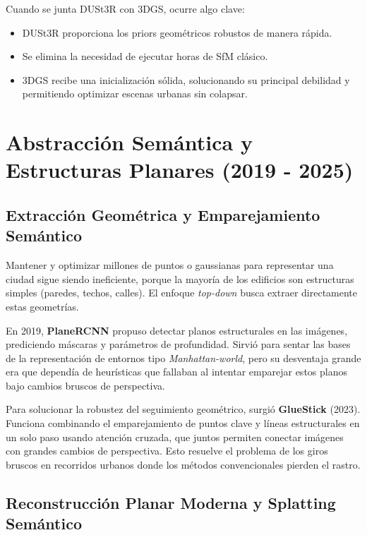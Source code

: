 Cuando se junta DUSt3R con 3DGS, ocurre algo clave:
\begin{itemize}
    \item DUSt3R proporciona los priors geométricos robustos de manera rápida.
    \item Se elimina la necesidad de ejecutar horas de SfM clásico.
    \item 3DGS recibe una inicialización sólida, solucionando su principal debilidad y permitiendo optimizar escenas urbanas sin colapsar.
\end{itemize}

\section{Abstracción Semántica y Estructuras Planares (2019 - 2025)}

\subsection{Extracción Geométrica y Emparejamiento Semántico}

Mantener y optimizar millones de puntos o gaussianas para representar una ciudad sigue siendo ineficiente, porque la mayoría de los edificios son estructuras simples (paredes, techos, calles). El enfoque \textit{top-down} busca extraer directamente estas geometrías.

En 2019, \textbf{PlaneRCNN} \cite{liu2019planercnn} propuso detectar planos estructurales en las imágenes, prediciendo máscaras y parámetros de profundidad. Sirvió para sentar las bases de la representación de entornos tipo \textit{Manhattan-world}, pero su desventaja grande era que dependía de heurísticas que fallaban al intentar emparejar estos planos bajo cambios bruscos de perspectiva.

Para solucionar la robustez del seguimiento geométrico, surgió \textbf{GlueStick} \cite{pelaez2023gluestick} (2023). Funciona combinando el emparejamiento de puntos clave y líneas estructurales en un solo paso usando atención cruzada, que juntos permiten conectar imágenes con grandes cambios de perspectiva. Esto resuelve el problema de los giros bruscos en recorridos urbanos donde los métodos convencionales pierden el rastro.

\subsection{Reconstrucción Planar Moderna y Splatting Semántico}

